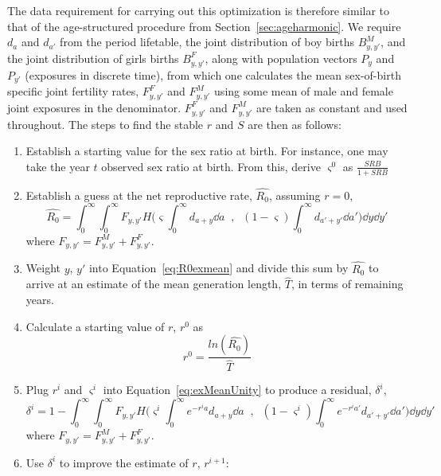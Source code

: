 The data requirement for carrying out this optimization is therefore similar to
that of the age-structured procedure from Section~\ref{sec:ageharmonic}. We
require $d_a$ and $d_{a'}$ from the period lifetable, the joint distribution
of boy births $B_{y,y'}^M$, and the joint distribution of girls
births $B_{y,y'}^F$, along with population vectors $P_y$ and $P_{y'}$ (exposures
in discrete time), from which one calculates the mean sex-of-birth
specific joint fertility rates, $F_{y,y'}^F$ and $F_{y,y'}^M$ using some mean of
male and female joint exposures in the denominator. $F_{y,y'}^F$ and
$F_{y,y'}^M$ are taken as constant and used throughout. The steps to find the stable $r$ and $S$
are then as follows:
\begin{enumerate}
  \item Establish a starting value for the sex ratio at birth. For instance, one
  may take the year $t$ observed sex ratio at birth. From this, derive
  $\varsigma^0$ as $\frac{SRB}{1+SRB}$
  \item Establish a guess at the net reproductive rate, $\widehat{R_0}$,
  assuming $r = 0$,
  \begin{equation}
  \label{eq:R0exmean}
  \widehat{R_0} = \int_0^\infty \int_0^\infty F_{y,y'} H\Bigg(\varsigma \int _0^\infty
 d_{a+y}\dd a\;\;,\;\; (1-\varsigma) \int _0^\infty
 d_{a'+y'} \dd a'\Bigg) \dd y \dd y'
  \end{equation}
  where $F_{y,y'} = F_{y,y'}^M + F_{y,y'}^F$.
  \item Weight $y$, $y'$ into Equation~\eqref{eq:R0exmean} and divide this sum
  by $\widehat{R_0}$ to arrive at an estimate of the mean generation length,
  $\widehat{T}$, in terms of remaining years. 
  \item Calculate a starting value of $r$, $r^0$ as
  \begin{equation}
  r^0 = \frac{ln(\widehat{R_0})}{\widehat{T}}
  \end{equation}
  \item Plug $r^i$ and $\varsigma^i$ into Equation~\eqref{eq:exMeanUnity} to
  produce a residual, $\delta^i$,
  \begin{equation}
 \label{eq:exMeanUnity}
 \delta^i = 1 - \int_0^\infty \int_0^\infty F_{y,y'} H\Bigg(\varsigma^i \int
 _0^\infty e^{-r^ia}d_{a+y}\dd a\;\;,\;\; (1-\varsigma^i) \int _0^\infty
 e^{-r^ia'}d_{a'+y'} \dd a'\Bigg) \dd y \dd y'
 \end{equation}
where $F_{y,y'} = F_{y,y'}^M + F_{y,y'}^F$.
  \item  Use $\delta^i$ to improve the estimate of $r$, $r^{i+1}$:

\end{enumerate}
